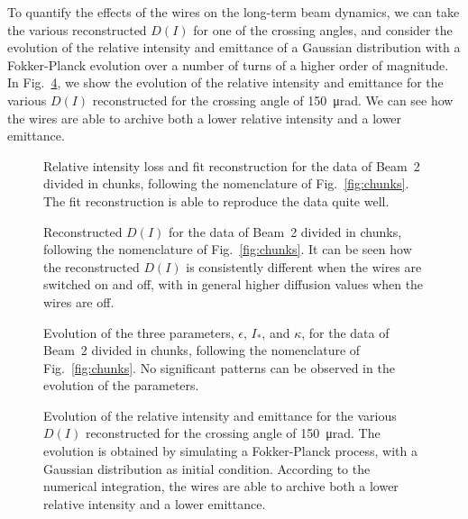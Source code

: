 To quantify the effects of the wires on the long-term beam dynamics, we can take the various reconstructed $D(I)$ for one of the crossing angles, and consider the evolution of the relative intensity and emittance of a Gaussian distribution with a Fokker-Planck evolution over a number of turns of a higher order of magnitude. In Fig.~\ref{fig:evolution}, we show the evolution of the relative intensity and emittance for the various $D(I)$ reconstructed for the crossing angle of \SI{150}{\micro\radian}. We can see how the wires are able to archive both a lower relative intensity and a lower emittance.

\begin{figure}[hpt]
    \centering
    \caption{Relative intensity loss and fit reconstruction for the data of Beam~2 divided in chunks, following the nomenclature of Fig.~\ref{fig:chunks}. 
    The fit reconstruction is able to reproduce the data quite well.}
    \label{fig:reconstruction_4}
\end{figure}

\begin{figure}[hpt]
    \centering
    \caption{Reconstructed $D(I)$ for the data of Beam~2 divided in chunks, following the nomenclature of Fig.~\ref{fig:chunks}. It can be seen how the reconstructed $D(I)$ is consistently different when the wires are switched on and off, with in general higher diffusion values when the wires are off.}
    \label{fig:reconstruction_5}
\end{figure}

\begin{figure}[hpt]
    \centering
    \caption{Evolution of the three parameters, $\epsilon$, $I_\ast$, and $\kappa$, for the data of Beam~2 divided in chunks, following the nomenclature of Fig.~\ref{fig:chunks}. No significant patterns can be observed in the evolution of the parameters.}
    \label{fig:parameters_3}
\end{figure}

\begin{figure}[hpt]
    \centering
    \caption{Evolution of the relative intensity and emittance for the various $D(I)$ reconstructed for the crossing angle of \SI{150}{\micro\radian}. The evolution is obtained by simulating a Fokker-Planck process, with a Gaussian distribution as initial condition. According to the numerical integration, the wires are able to archive both a lower relative intensity and a lower emittance.}
    \label{fig:evolution}
\end{figure}

